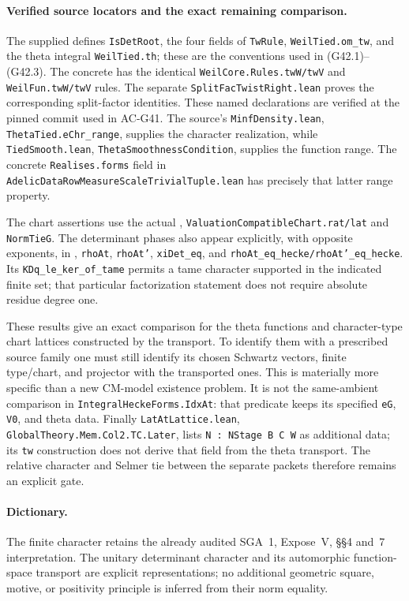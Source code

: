 \paragraph{Verified source locators and the exact remaining comparison.}
The supplied
defines \texttt{IsDetRoot}, the four fields of
\texttt{TwRule}, \texttt{WeilTied.om\_tw}, and the
theta integral \texttt{WeilTied.th}; these are the
conventions used in (G42.1)--(G42.3).  The concrete
has the identical \texttt{WeilCore.Rules.twW/twV}
and \texttt{WeilFun.twW/twV} rules.  The separate
\texttt{SplitFacTwistRight.lean} proves the corresponding
split-factor identities.  These named declarations
are verified at the pinned commit used in AC-G41.
The source's \texttt{MinfDensity.lean},
\texttt{ThetaTied.eChr\_range}, supplies the character
realization, while \texttt{TiedSmooth.lean},
\texttt{ThetaSmoothnessCondition}, supplies the function
range.  The concrete \texttt{Realises.forms} field
in \texttt{AdelicDataRowMeasureScaleTrivialTuple.lean}
has precisely that latter range property.

The chart assertions use the actual
,
\texttt{ValuationCompatibleChart.rat/lat} and
\texttt{NormTieG}.  The determinant phases also appear
explicitly, with opposite exponents, in
,
\texttt{rhoAt}, \texttt{rhoAt'}, \texttt{xiDet\_eq},
and \texttt{rhoAt\_eq\_hecke/rhoAt'\_eq\_hecke}.
Its \texttt{KDq\_le\_ker\_of\_tame} permits a tame
character supported in the indicated finite set;
that particular factorization statement does not
require absolute residue degree one.

These results give an exact comparison for the theta
functions and character-type chart lattices constructed
by the transport.  To identify them with a prescribed
source family one must still identify its chosen
Schwartz vectors, finite type/chart, and projector with
the transported ones.  This is materially more specific
than a new CM-model existence problem.  It is not the
same-ambient comparison in
\texttt{IntegralHeckeForms.IdxAt}: that predicate keeps
its specified \texttt{eG}, \texttt{V0}, and theta data.
Finally \texttt{LatAtLattice.lean},
\texttt{GlobalTheory.Mem.Col2.TC.Later}, lists
\texttt{N : NStage B C W} as additional data; its
\texttt{tw} construction does not derive that field
from the theta transport.  The relative character
and Selmer tie between the separate packets therefore
remains an explicit gate.

\paragraph{Dictionary.}
The finite character retains the already audited
SGA~1, Expose~V, \S\S4 and~7 interpretation.
The unitary determinant character and its automorphic
function-space transport are explicit representations;
no additional geometric square, motive, or positivity
principle is inferred from their norm equality.
